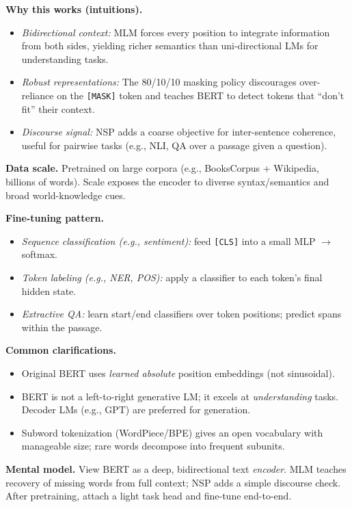 \documentclass{article}
\begin{document}
\noindent\textbf{Why this works (intuitions).}
\begin{itemize}
  \item \emph{Bidirectional context:} MLM forces every position to integrate information from both sides, yielding richer semantics than uni-directional LMs for understanding tasks.
  \item \emph{Robust representations:} The 80/10/10 masking policy discourages over-reliance on the \texttt{[MASK]} token and teaches BERT to detect tokens that ``don’t fit'' their context.
  \item \emph{Discourse signal:} NSP adds a coarse objective for inter-sentence coherence, useful for pairwise tasks (e.g., NLI, QA over a passage given a question).
\end{itemize}

\noindent\textbf{Data scale.} Pretrained on large corpora (e.g., BooksCorpus + Wikipedia, billions of words). Scale exposes the encoder to diverse syntax/semantics and broad world-knowledge cues.

\medskip
\noindent\textbf{Fine-tuning pattern.}
\begin{itemize}
  \item \emph{Sequence classification (e.g., sentiment):} feed \texttt{[CLS]} into a small MLP $\rightarrow$ softmax.
  \item \emph{Token labeling (e.g., NER, POS):} apply a classifier to each token’s final hidden state.
  \item \emph{Extractive QA:} learn start/end classifiers over token positions; predict spans within the passage.
\end{itemize}

\noindent\textbf{Common clarifications.}
\begin{itemize}
  \item Original BERT uses \emph{learned absolute} position embeddings (not sinusoidal).
  \item BERT is not a left-to-right generative LM; it excels at \emph{understanding} tasks. Decoder LMs (e.g., GPT) are preferred for generation.
  \item Subword tokenization (WordPiece/BPE) gives an open vocabulary with manageable size; rare words decompose into frequent subunits.
\end{itemize}

\noindent\textbf{Mental model.} View BERT as a deep, bidirectional text \emph{encoder}. MLM teaches recovery of missing words from full context; NSP adds a simple discourse check. After pretraining, attach a light task head and fine-tune end-to-end.
\end{document}
